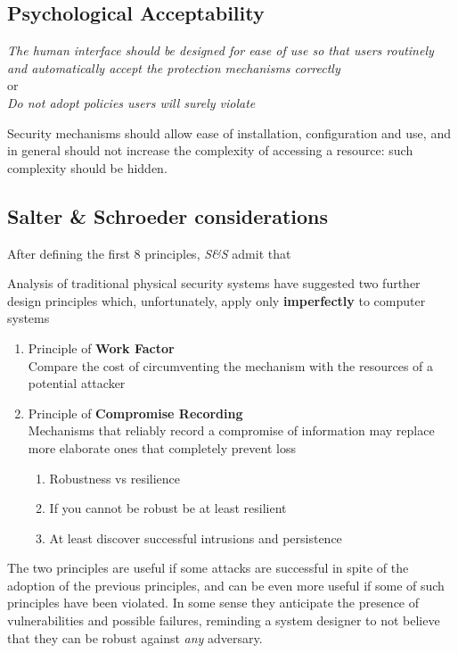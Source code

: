 \subsection{Psychological Acceptability}
\begin{center}
   \textit{The human interface should be designed for ease of use so that
   users routinely and automatically accept the protection
   mechanisms correctly}\\
   or\\
   \textit{Do not adopt policies users will surely violate}
\end{center}

Security mechanisms should allow ease of installation, configuration and use,
and in general should not increase the complexity of
accessing a resource: such complexity should be hidden.

\subsection{Salter \& Schroeder considerations}
After defining the first 8 principles, \textit{S\&S} admit that
\begin{center}
   Analysis of traditional physical security systems have suggested
   two further design principles which, unfortunately, apply only
   \textbf{imperfectly} to computer systems
\end{center}

\begin{enumerate}
   \item Principle of \textbf{Work Factor}\\
   Compare the cost of circumventing the mechanism with the
   resources of a potential attacker
   \item Principle of \textbf{Compromise Recording}\\
   Mechanisms that reliably record a compromise of information
   may replace more elaborate ones that completely prevent loss
   \begin{enumerate}
      \item Robustness vs resilience
      \item If you cannot be robust be at least resilient
      \item At least discover successful intrusions and persistence
   \end{enumerate}
\end{enumerate}

The two principles are useful if some attacks are
successful in spite of the adoption of the previous
principles, and can be even more useful if some of such principles have been violated.
In some sense they anticipate the presence of vulnerabilities and possible failures,
reminding a system designer to not believe that they can be robust against \textit{any} adversary.


